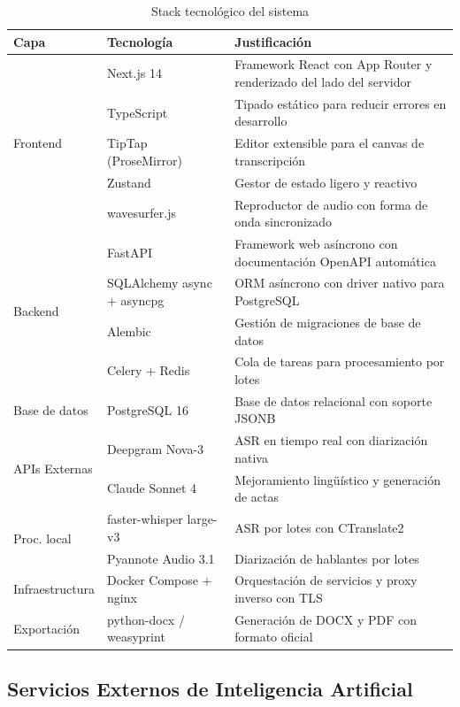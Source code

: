 \documentclass[12pt,a4paper,oneside]{report}
\begin{document}
\begin{table}[H]
\centering
\small
\caption{Stack tecnológico del sistema}
\begin{tabular}{|p{2.2cm}|p{3.2cm}|p{7cm}|}
\hline
\rowcolor{gray!20}
\textbf{Capa} & \textbf{Tecnología} & \textbf{Justificación} \\
\hline
\multirow{5}{2.2cm}{Frontend} & Next.js 14 & Framework React con App Router y renderizado del lado del servidor \\
\cline{2-3}
& TypeScript & Tipado estático para reducir errores en desarrollo \\
\cline{2-3}
& TipTap (ProseMirror) & Editor extensible para el canvas de transcripción \\
\cline{2-3}
& Zustand & Gestor de estado ligero y reactivo \\
\cline{2-3}
& wavesurfer.js & Reproductor de audio con forma de onda sincronizado \\
\hline
\multirow{4}{2.2cm}{Backend} & FastAPI & Framework web asíncrono con documentación OpenAPI automática \\
\cline{2-3}
& SQLAlchemy async + asyncpg & ORM asíncrono con driver nativo para PostgreSQL \\
\cline{2-3}
& Alembic & Gestión de migraciones de base de datos \\
\cline{2-3}
& Celery + Redis & Cola de tareas para procesamiento por lotes \\
\hline
Base de datos & PostgreSQL 16 & Base de datos relacional con soporte JSONB \\
\hline
\multirow{2}{2.2cm}{APIs Externas} & Deepgram Nova-3 & ASR en tiempo real con diarización nativa \\
\cline{2-3}
& Claude Sonnet 4 & Mejoramiento lingüístico y generación de actas \\
\hline
\multirow{2}{2.2cm}{Proc. local} & faster-whisper large-v3 & ASR por lotes con CTranslate2 \\
\cline{2-3}
& Pyannote Audio 3.1 & Diarización de hablantes por lotes \\
\hline
Infraestructura & Docker Compose + nginx & Orquestación de servicios y proxy inverso con TLS \\
\hline
Exportación & python-docx / weasyprint & Generación de DOCX y PDF con formato oficial \\
\hline
\end{tabular}
\label{tab:stack}
\end{table}

\subsection{Servicios Externos de Inteligencia Artificial}
\end{document}
